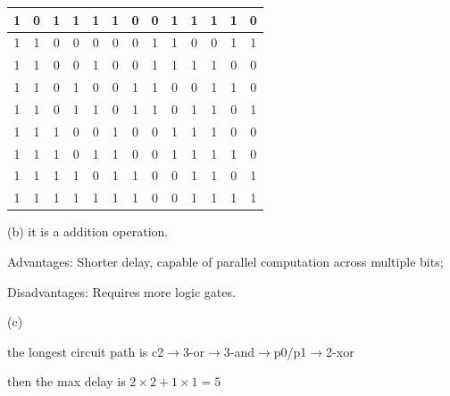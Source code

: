\documentclass[a4paper]{article}
\begin{document}
\begin{answer}[Question 1]
\begin{center}
\begin{tabular}{ |c|c|c|c|c|c|c|c|c|c|c|c|c| }
            \hline
            1&0&1&1&1&1&0&0&1&1&1&1&0\\
            \hline
            1&1&0&0&0&0&0&1&1&0&0&1&1\\
            \hline
            1&1&0&0&1&0&0&1&1&1&1&0&0\\
            \hline
            1&1&0&1&0&0&1&1&0&0&1&1&0\\
            \hline
            1&1&0&1&1&0&1&1&0&1&1&0&1\\
            \hline
            1&1&1&0&0&1&0&0&1&1&1&0&0\\
            \hline
            1&1&1&0&1&1&0&0&1&1&1&1&0\\
            \hline
            1&1&1&1&0&1&1&0&0&1&1&0&1\\
            \hline
            1&1&1&1&1&1&1&0&0&1&1&1&1\\
            \hline
        \end{tabular}        
    \end{center}
    (b)
    it is a addition operation.


    Advantages: Shorter delay, capable of parallel computation across multiple bits;

    Disadvantages: Requires more logic gates.

    (c)

    the longest circuit path is c2$\rightarrow$3-or$\rightarrow$3-and$\rightarrow$p0/p1$\rightarrow$2-xor

    then the max delay is $2\times2+1\times1=5$
\end{answer}

\newpage
\end{document}
